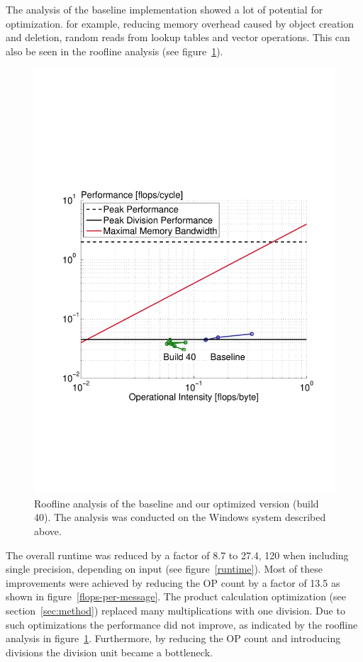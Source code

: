 The analysis of the baseline implementation showed a lot of potential for optimization. for example, reducing memory overhead caused by object creation and deletion, random reads from lookup tables and vector operations. This can also be seen in the roofline analysis \cite{Ofenbeck:14} (see figure~\ref{roofline-mixed}).
\begin{figure}\centering
    \includegraphics[scale=0.4, trim={2cm 6.5cm 1cm 8.5cm},clip]{graphics/roofline_mixed.pdf}
  \caption{Roofline analysis of the baseline and our optimized version (build 40). The analysis was conducted on the Windows system described above.\label{roofline-mixed}}
\end{figure}

The overall runtime was reduced by a factor of 8.7 to 27.4, 120 when including single precision, depending on input (see figure~\ref{runtime}). Most of these improvements were achieved by reducing the OP count by a factor of 13.5 as shown in figure~\ref{flops-per-message}. The product calculation optimization (see section~\ref{sec:method}) replaced many multiplications with one division. Due to such optimizations the performance did not improve, as indicated by the roofline analysis in figure~\ref{roofline-mixed}. Furthermore, by reducing the OP count and introducing divisions the division unit became a bottleneck.

